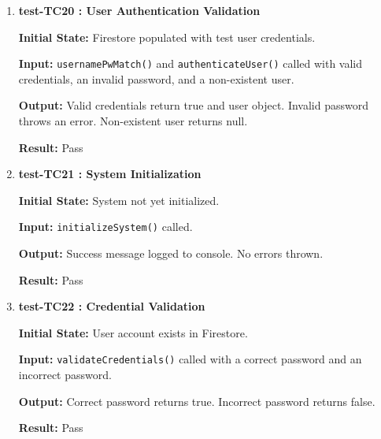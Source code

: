 \documentclass[12pt, titlepage]{article}
\begin{document}
\begin{enumerate}
	\textbf{Initial State:} Firestore populated with a valid physiotherapist and linked patient.
	
	\textbf{Input:} \texttt{deletePTAccount()} called with a valid physio, a non-physio user, and a non-existent patient.
	
	\textbf{Output:} Valid case deletes patient successfully. Non-physio and non-existent cases throw appropriate errors.
	
	\textbf{Result:} Pass
	
	\vspace{0.5em}
	
	\item \textbf{test-TC20 : User Authentication Validation}
	
	\textbf{Initial State:} Firestore populated with test user credentials.
	
	\textbf{Input:} \texttt{usernamePwMatch()} and \texttt{authenticateUser()} called with valid credentials, an invalid password, and a non-existent user.
	
	\textbf{Output:} Valid credentials return true and user object. Invalid password throws an error. Non-existent user returns null.
	
	\textbf{Result:} Pass
	
	\vspace{0.5em}
	
	\item \textbf{test-TC21 : System Initialization}
	
	\textbf{Initial State:} System not yet initialized.
	
	\textbf{Input:} \texttt{initializeSystem()} called.
	
	\textbf{Output:} Success message logged to console. No errors thrown.
	
	\textbf{Result:} Pass
	
	\vspace{0.5em}
	
	\item \textbf{test-TC22 : Credential Validation}
	
	\textbf{Initial State:} User account exists in Firestore.
	
	\textbf{Input:} \texttt{validateCredentials()} called with a correct password and an incorrect password.
	
	\textbf{Output:} Correct password returns true. Incorrect password returns false.
	
	\textbf{Result:} Pass
	
	\vspace{0.5em}
	
	
\end{enumerate}
\end{document}
